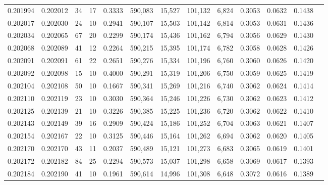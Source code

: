 \begin{tabular}{rrrrrrrrrrrrr}
0.201994 & 0.202012 &    34 &  17 &                                     0.3333 & 590,083 &  15,527 & 101,132 &   6,824 & 0.3053 & 0.0632 & 0.1438 \\
0.202017 & 0.202030 &    24 &  10 &                                     0.2941 & 590,107 &  15,503 & 101,142 &   6,814 & 0.3053 & 0.0631 & 0.1436 \\
0.202034 & 0.202065 &    67 &  20 &                                     0.2299 & 590,174 &  15,436 & 101,162 &   6,794 & 0.3056 & 0.0629 & 0.1430 \\
0.202068 & 0.202089 &    41 &  12 &                                     0.2264 & 590,215 &  15,395 & 101,174 &   6,782 & 0.3058 & 0.0628 & 0.1426 \\
0.202091 & 0.202091 &    61 &  22 &                                     0.2651 & 590,276 &  15,334 & 101,196 &   6,760 & 0.3060 & 0.0626 & 0.1420 \\
0.202092 & 0.202098 &    15 &  10 &                                     0.4000 & 590,291 &  15,319 & 101,206 &   6,750 & 0.3059 & 0.0625 & 0.1419 \\
0.202104 & 0.202108 &    50 &  10 &                                     0.1667 & 590,341 &  15,269 & 101,216 &   6,740 & 0.3062 & 0.0624 & 0.1414 \\
0.202110 & 0.202119 &    23 &  10 &                                     0.3030 & 590,364 &  15,246 & 101,226 &   6,730 & 0.3062 & 0.0623 & 0.1412 \\
0.202125 & 0.202139 &    21 &  10 &                                     0.3226 & 590,385 &  15,225 & 101,236 &   6,720 & 0.3062 & 0.0622 & 0.1410 \\
0.202143 & 0.202149 &    39 &  16 &                                     0.2909 & 590,424 &  15,186 & 101,252 &   6,704 & 0.3063 & 0.0621 & 0.1407 \\
0.202154 & 0.202167 &    22 &  10 &                                     0.3125 & 590,446 &  15,164 & 101,262 &   6,694 & 0.3062 & 0.0620 & 0.1405 \\
0.202170 & 0.202170 &    43 &  11 &                                     0.2037 & 590,489 &  15,121 & 101,273 &   6,683 & 0.3065 & 0.0619 & 0.1401 \\
0.202172 & 0.202182 &    84 &  25 &                                     0.2294 & 590,573 &  15,037 & 101,298 &   6,658 & 0.3069 & 0.0617 & 0.1393 \\
0.202184 & 0.202190 &    41 &  10 &                                     0.1961 & 590,614 &  14,996 & 101,308 &   6,648 & 0.3072 & 0.0616 & 0.1389 \\

\end{tabular}

